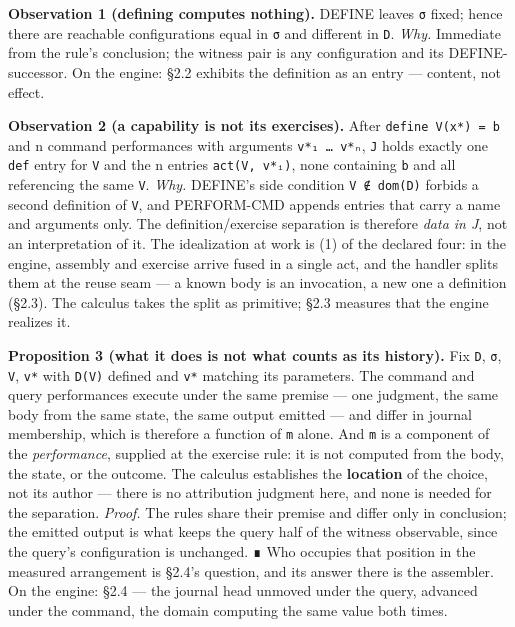 \documentclass[
]{article}
\newcounter{none} %
\begin{document}
\textbf{Observation 1 (defining computes nothing).} DEFINE leaves
\texttt{σ} fixed; hence there are reachable configurations equal in
\texttt{σ} and different in \texttt{D}. \emph{Why.} Immediate from the
rule's conclusion; the witness pair is any configuration and its
DEFINE-successor. On the engine: §2.2 exhibits the definition as an
entry --- content, not effect.

\textbf{Observation 2 (a capability is not its exercises).} After
\texttt{define\ V(x*)\ =\ b} and n command performances with arguments
\texttt{v*₁\ …\ v*ₙ}, \texttt{J} holds exactly one \texttt{def} entry
for \texttt{V} and the n entries \texttt{act(V,\ v*ᵢ)}, none containing
\texttt{b} and all referencing the same \texttt{V}. \emph{Why.} DEFINE's
side condition \texttt{V\ ∉\ dom(D)} forbids a second definition of
\texttt{V}, and PERFORM-CMD appends entries that carry a name and
arguments only. The definition/exercise separation is therefore
\emph{data in J}, not an interpretation of it. The idealization at work
is (1) of the declared four: in the engine, assembly and exercise arrive
fused in a single act, and the handler splits them at the reuse seam ---
a known body is an invocation, a new one a definition (§2.3). The
calculus takes the split as primitive; §2.3 measures that the engine
realizes it.

\textbf{Proposition 3 (what it does is not what counts as its history).}
Fix \texttt{D}, \texttt{σ}, \texttt{V}, \texttt{v*} with \texttt{D(V)}
defined and \texttt{\textbar{}v*\textbar{}} matching its parameters. The
command and query performances execute under the same premise --- one
judgment, the same body from the same state, the same output emitted ---
and differ in journal membership, which is therefore a function of
\texttt{m} alone. And \texttt{m} is a component of the
\emph{performance}, supplied at the exercise rule: it is not computed
from the body, the state, or the outcome. The calculus establishes the
\textbf{location} of the choice, not its author --- there is no
attribution judgment here, and none is needed for the separation.
\emph{Proof.} The rules share their premise and differ only in
conclusion; the emitted output is what keeps the query half of the
witness observable, since the query's configuration is unchanged. ∎ Who
occupies that position in the measured arrangement is §2.4's question,
and its answer there is the assembler. On the engine: §2.4 --- the
journal head unmoved under the query, advanced under the command, the
domain computing the same value both times.
\end{document}
